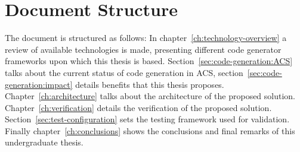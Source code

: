 \section{Document Structure}
\label{sec:documentStructure}
The document is structured as follows:
In chapter~\ref{ch:technology-overview} a review of
available technologies is made,
presenting different code generator
frameworks upon which this thesis is based.
Section~\ref{sec:code-generation:ACS} talks about
the current status of code generation in ACS,
section~\ref{sec:code-generation:impact}
details benefits that this thesis proposes.
Chapter~\ref{ch:architecture} talks about the
architecture of the proposed solution.
Chapter~\ref{ch:verification} details the verification
of the proposed solution.
Section~\ref{sec:test-configuration} sets the
testing framework used for validation.
Finally chapter~\ref{ch:conclusions} shows the conclusions
and final remarks of this undergraduate thesis.

